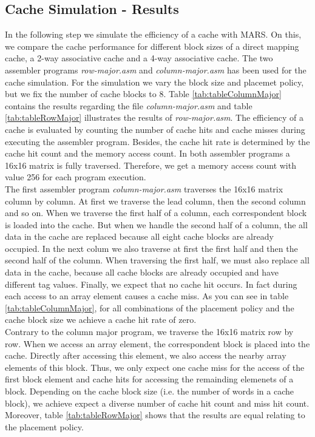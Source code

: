 \subsection{Cache Simulation - Results}
\label{sec:cacheSimulation}
In the following step we simulate the efficiency of a cache with MARS. On this, we compare the cache performance for different block sizes of a direct mapping cache, a 2-way associative cache and a 4-way associative cache. The two assembler programs \textit{row-major.asm} and \textit{column-major.asm} has been used for the cache simulation. For the simulation we vary the block size and placemet policy, but we fix the number of cache blocks to 8. Table \ref{tab:tableColumnMajor} contains the results regarding the file \textit{column-major.asm} and table \ref{tab:tableRowMajor} illustrates the results of \textit{row-major.asm}. The efficiency of a cache is evaluated by counting the number of cache hits and cache misses during executing the assembler program. Besides, the cache hit rate is determined by the cache hit count and the memory access count. In both assembler programs a 16x16 matrix is fully traversed. Therefore, we get a memory access count with value 256 for each program execution.\\
The first assembler program \textit{column-major.asm} traverses the 16x16 matrix column by column. At first we traverse the lead column, then the second column and so on. When we traverse the first half of a column, each correspondent block is loaded into the cache. But when we handle the second half of a column, the all data in the cache are replaced because all eight cache blocks are already occupied. In the next colum we also traverse at first the first half and then the second half of the column. When traversing the first half, we must also replace all data in the cache, because all cache blocks are already occupied and have different tag values. Finally, we expect that no cache hit occurs. In fact during each access to an array element causes a cache miss. As you can see in table \ref{tab:tableColumnMajor}, for all combinations of the placement policy and the cache block size we achieve a cache hit rate of zero.\\
Contrary to the column major program, we traverse the 16x16 matrix row by row. When we access an array element, the correspondent block is placed into the cache. Directly after accessing this element, we also access the nearby array elements of this block. Thus, we only expect one cache miss for the access of the first block element and cache hits  for accessing the remainding elemenets of a block. Depending on the cache block size (i.e. the number of words in a cache block), we achieve expect a diverse number of cache hit count and miss hit count. Moreover, table \ref{tab:tableRowMajor} shows that the results are equal relating to the placement policy.\\
